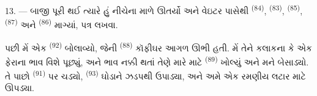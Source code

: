 13. --- બાજી પૂરી થઈ ત્યારે હું નીચેના માળે ઊતર્યો અને વેઇટર પાસેથી
 \textsuperscript{(84)},  \textsuperscript{(83)},
 \textsuperscript{(85)}, 
\textsuperscript{(87)} અને  \textsuperscript{(86)} માગ્યાં,
પત્ર લખવા.

પછી મેં એક  \textsuperscript{(92)} બોલાવ્યો, જેની
 \textsuperscript{(88)} કૉફીઘર આગળ ઊભી હતી. મેં તેને
કલાકના કે એક ફેરાના ભાવ વિશે પૂછ્યું, અને ભાવ નક્કી થતાં તેણે મારે
માટે  \textsuperscript{(89)} ખોલ્યું અને મને
બેસાડ્યો. તે પાછો  \textsuperscript{(91)} પર ચડ્યો,
 \textsuperscript{(93)} ઘોડાને ઝડપથી ઉપાડ્યા, અને અમે
એક રમણીય લટાર માટે ઊપડ્યા.

\VUsaut{6.0mm}
\VUfilet{22mm}
